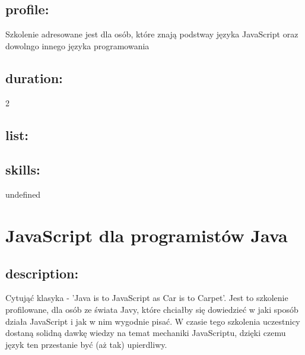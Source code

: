 \documentclass{article}[10pt]
\begin{document}
	\subsection*{profile:}
\begin{adjustwidth}{2cm}{}
	Szkolenie adresowane jest dla osób, które znają podstway języka JavaScript oraz dowolngo innego języka programowania
\end{adjustwidth}
	\subsection*{duration:}
\begin{adjustwidth}{2cm}{}
	2
\end{adjustwidth}

	\subsection*{list:}
\begin{adjustwidth}{1.5cm}{}
	\begin{itemize}










	\end{itemize}
\end{adjustwidth}

	\subsection*{skills:}
\begin{adjustwidth}{2cm}{}
	undefined
\end{adjustwidth}

\newpage


    
	\section{JavaScript dla programistów Java}

	\subsection*{description:}
	\begin{adjustwidth}{2cm}{}
		Cytująć klasyka - 'Java is to JavaScript as Car is to Carpet'. 
    Jest to szkolenie profilowane, dla osób ze świata Javy, które chciałby się dowiedzieć w jaki sposób działa JavaScript i jak w nim wygodnie pisać.
    W czasie tego szkolenia uczestnicy dostaną solidną dawkę wiedzy na temat mechaniki JavaScriptu, dzięki czemu język ten przestanie być (aż tak) upierdliwy.
	\end{adjustwidth}
\end{document}
